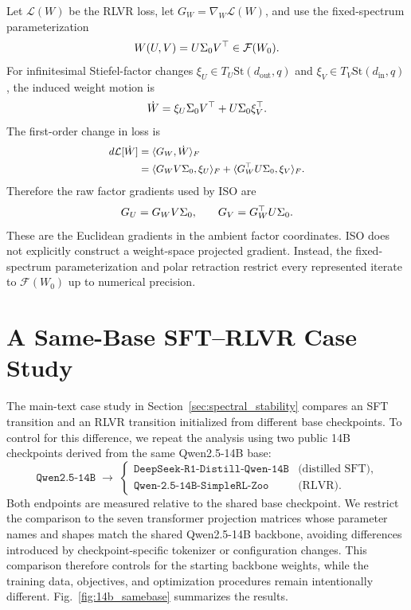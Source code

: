 \documentclass[11pt, a4paper]{utda}
\theoremstyle{plain}
\theoremstyle{definition}
\theoremstyle{remark}
\begin{document}
Let $\mathcal{L}(W)$ be the RLVR loss, let
$G_W=\nabla_W\mathcal{L}(W)$, and use the fixed-spectrum parameterization
\begin{equation}
\small
    W(U,V)=U\Sigma_0V^\top\in\mathcal F(W_0) .
\end{equation}
For infinitesimal Stiefel-factor changes
$\xi_U\in T_U\mathrm{St}(d_{\mathrm{out}},q)$ and
$\xi_V\in T_V\mathrm{St}(d_{\mathrm{in}},q)$, the induced weight motion is
\begin{equation}
\small
    \dot W
    =
    \xi_U\Sigma_0V^\top
    +
    U\Sigma_0\xi_V^\top .
\end{equation}
The first-order change in loss is
\begin{equation}
\small
\begin{aligned}
    d\mathcal{L}[\dot W]
    &=
    \langle G_W,\dot W\rangle_F \\
    &=
    \langle G_WV\Sigma_0,\xi_U\rangle_F
    +
    \langle G_W^\top U\Sigma_0,\xi_V\rangle_F .
\end{aligned}
\end{equation}
Therefore the raw factor gradients used by ISO are
\begin{equation}
\small
    G_U=G_WV\Sigma_0,
    \qquad
    G_V=G_W^\top U\Sigma_0 .
\end{equation}
These are the Euclidean gradients in the ambient factor coordinates.
ISO does not explicitly construct a weight-space projected gradient.
Instead, the fixed-spectrum parameterization and polar retraction restrict
every represented iterate to $\mathcal F(W_0)$ up to numerical precision.

\section{A Same-Base SFT--RLVR Case Study}
\label{app:14b_sft_rl}

The main-text case study in Section~\ref{sec:spectral_stability} compares an SFT
transition and an RLVR transition initialized from different base checkpoints.
To control for this difference, we repeat the analysis using two public
14B checkpoints derived from the same Qwen2.5-14B base:
\[
    \texttt{Qwen2.5-14B}
    \;\longrightarrow\;
    \begin{cases}
        \texttt{DeepSeek-R1-Distill-Qwen-14B}
        & \text{(distilled SFT)},\\[2pt]
        \texttt{Qwen-2.5-14B-SimpleRL-Zoo}
        & \text{(RLVR)}.
    \end{cases}
\]
Both endpoints are measured relative to the shared base checkpoint. We restrict
the comparison to the seven transformer projection matrices whose parameter
names and shapes match the shared Qwen2.5-14B backbone, avoiding differences
introduced by checkpoint-specific tokenizer or configuration changes. This
comparison therefore controls for the starting backbone weights, while the
training data, objectives, and optimization procedures remain intentionally
different. Fig.~\ref{fig:14b_samebase} summarizes the results.
\end{document}
